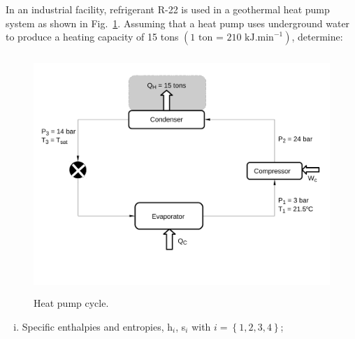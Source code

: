 \documentclass[calculator,steamtables,refrigeranttables,psychrometricchart,datasheet,solutions,resit]{exam}
\begin{document}
\begin{question}

In an industrial facility, refrigerant R-22 is used in a geothermal heat pump system as shown in Fig.~\ref{Exam01_Prob4}. Assuming that a heat pump uses underground water to produce a heating capacity of 15 tons $\left(\text{1 ton = 210 kJ.min}^{-1}\right)$, determine:
\begin{figure}[!h]
\begin{center}
\includegraphics[width=12.0cm,height=9.0cm]{./Pics/Exam_Refrigeration14-15}
\end{center}
\vspace{-1.8cm}
\caption{Heat pump cycle.}\label{Exam01_Prob4}
\end{figure}
\begin{enumerate}[(i)]
 \item Specific enthalpies and entropies, h$_{i}$, s$_{i}$ with $i=\left\{1,2,3,4\right\}$;~
\end{enumerate}
\end{question}
\end{document}
